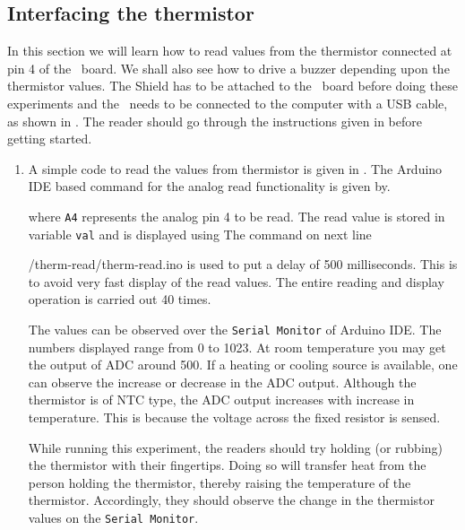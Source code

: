 \subsection{Interfacing the thermistor}
In this section we will learn how to read values from the thermistor
connected at pin 4 of the \arduino\ board. We shall also see how to
drive a buzzer depending upon the thermistor values. The Shield has to be attached to the \arduino\ board
before doing these experiments and the \arduino\ needs to be connected to the computer
with a USB cable, as shown in . The reader should go through the
instructions given in  before getting started.

\begin{enumerate}
  \item A simple code to read the values from thermistor is given in
        . The Arduino IDE based command for the analog read functionality is given by.
        
        where {\tt A4} represents the analog pin 4 to be read.
        The read value is stored in variable {\tt val} and is
        displayed using 
        The command on next line

          {\LocTHERMardcode/therm-read/therm-read.ino}
        is used to put a delay of 500 milliseconds. This is to avoid very fast display of the read values. The entire reading and display operation is carried out 40 times.

        The values can be observed over the {\tt Serial Monitor} of Arduino IDE.
        The numbers displayed range from 0 to 1023. At room temperature you may get the
        output of ADC around 500. If a heating or cooling source is available,
        one can observe the increase or decrease in the ADC output. Although
        the thermistor is of NTC type, the ADC output increases with increase
        in temperature. This is because the voltage across the fixed resistor
        is sensed.

        While running this experiment,
        the readers should try holding (or rubbing) the thermistor with their fingertips.
        Doing so will transfer heat from the person holding the
        thermistor, thereby raising the temperature of the thermistor. Accordingly, they should observe the change in the thermistor values
        on the {\tt Serial Monitor}.


\end{enumerate}
